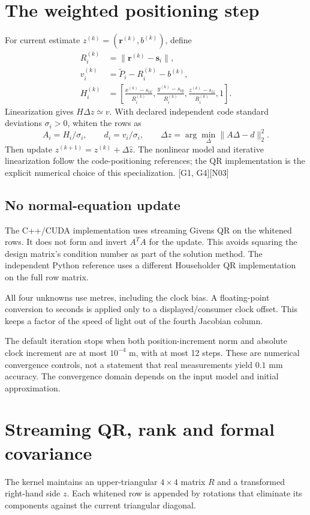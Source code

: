 \documentclass[11pt,a4paper]{article}
\newcommand{\ext}[1]{\textcolor{muted}{[#1]}}
\newcommand{\dec}[1]{\textcolor{accent}{[N#1]}}
\begin{document}
\section{The weighted positioning step}
For current estimate $z^{(k)}=(\boldsymbol r^{(k)},b^{(k)})$, define
\begin{align}
R_i^{(k)}&=\|\boldsymbol r^{(k)}-\boldsymbol s_i\|,\\
v_i^{(k)}&=\widetilde P_i-R_i^{(k)}-b^{(k)},\\
H_i^{(k)}&=\left[\frac{x^{(k)}-s_{ix}}{R_i^{(k)}},
\frac{y^{(k)}-s_{iy}}{R_i^{(k)}},
\frac{z^{(k)}-s_{iz}}{R_i^{(k)}},1\right].
\end{align}
Linearization gives $H\Delta z\simeq v$. With declared independent code standard
deviations $\sigma_i>0$, whiten the rows as
\begin{equation}
A_i=H_i/\sigma_i,\qquad d_i=v_i/\sigma_i,
\qquad\Delta\widehat z=\arg\min_\Delta\|A\Delta-d\|_2^2.
\end{equation}
Then update $z^{(k+1)}=z^{(k)}+\Delta\widehat z$. The nonlinear model and iterative
linearization follow the code-positioning references; the QR implementation is the
explicit numerical choice of this specialization. \ext{G1, G4}\dec{03}

\subsection{No normal-equation update}
The C++/CUDA implementation uses streaming Givens QR on the whitened rows. It does
not form and invert $A^TA$ for the update. This avoids squaring the design matrix's
condition number as part of the solution method. The independent Python reference
uses a different Householder QR implementation on the full row matrix.

All four unknowns use metres, including the clock bias. A floating-point conversion
to seconds is applied only to a displayed/consumer clock offset. This keeps a factor
of the speed of light out of the fourth Jacobian column.

The default iteration stops when both position-increment norm and absolute clock
increment are at most $10^{-4}$ m, with at most 12 steps. These are numerical
convergence controls, not a statement that real measurements yield $0.1$ mm accuracy.
The convergence domain depends on the input model and initial approximation.
\clearpage

\section{Streaming QR, rank and formal covariance}
The kernel maintains an upper-triangular $4\times4$ matrix $R$ and a transformed
right-hand side $z$. Each whitened row is appended by rotations that eliminate its
components against the current triangular diagonal.
\end{document}

